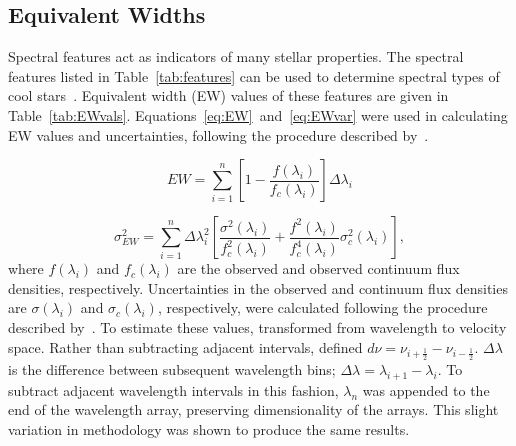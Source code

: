 \subsection{Equivalent Widths}

Spectral features act as indicators of many stellar properties.  The 
spectral features listed in Table~\ref{tab:features} 
can be used to determine spectral types of cool 
stars~\cite{Rayner_2009}.  Equivalent width (EW) 
values of these features are given in Table~\ref{tab:EWvals}.  
Equations~\ref{eq:EW}~and~\ref{eq:EWvar} were used in calculating EW values 
and uncertainties, following the procedure described by~\cite{Cushing_2005}. 


\begin{equation}\label{eq:EW}
	EW = \sum_{i=1}^{n} [1 - \frac{f(\lambda_{i})}{f_{c}(\lambda_{i})}] \Delta\lambda_{i}
\end{equation}

\begin{equation}\label{eq:EWvar}
	\sigma_{EW}^{2} = \sum_{i=1}^{n} \Delta\lambda_{i}^{2} [\frac{\sigma^{2}(\lambda_{i})}{f_{c}^{2}(\lambda_{i})} + \frac{f^{2}(\lambda_{i})}{f_{c}^{4}(\lambda_{i})}\sigma_{c}^{2}(\lambda_{i})],
\end{equation}
where $f(\lambda_{i})$ and $f_{c}(\lambda_{i})$ are the observed 
and observed continuum flux densities, respectively.  Uncertainties in the 
observed and continuum flux densities are $\sigma(\lambda_{i})$ and 
$\sigma_{c}(\lambda_{i})$, respectively, were calculated following the procedure 
described by~\cite{Sembach_1992}.  To estimate these values, \cite{Sembach_1992} 
transformed from wavelength to velocity space.  Rather than subtracting adjacent intervals, 
\cite{Sembach_1992} defined $d\nu = \nu_{i+\frac{1}{2}} - \nu_{i-\frac{1}{2}}$.  
$\Delta\lambda$ is the difference between subsequent wavelength bins; 
$\Delta\lambda = \lambda_{i+1} - \lambda_{i}$.  To subtract adjacent 
wavelength intervals in this fashion, $\lambda_{n}$ was appended to the 
end of the wavelength array, preserving dimensionality of the arrays.  
This slight variation in methodology was shown to produce the same results.



